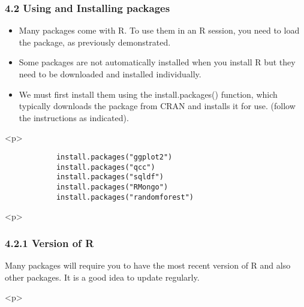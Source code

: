  		\frametitle{4.2 Using and Installing packages}
 		\begin{itemize}
 			\item Many packages come with R. To use them in an R session, you need to load the package, as
 			previously demonstrated.
 			\item Some packages are not automatically installed when you install R but they need to be downloaded
 			and installed individually. 
 			\item We must first install them using the install.packages()
 			function, which typically downloads the package from CRAN and installs it for use. (follow the
 			instructions as indicated).
 		\end{itemize}
<p>

 		\begin{framed}
 			\begin{verbatim}
 			install.packages("ggplot2")
 			install.packages("qcc")
 			install.packages("sqldf")
 			install.packages("RMongo")
 			install.packages("randomforest")
 			\end{verbatim}
 		\end{framed}
 		
<p>

 		\frametitle{4.2.1 Version of R}
 		Many packages will require you to have the most recent version of R and also other packages.
 		It is a good idea to update regularly.

<p>

 

